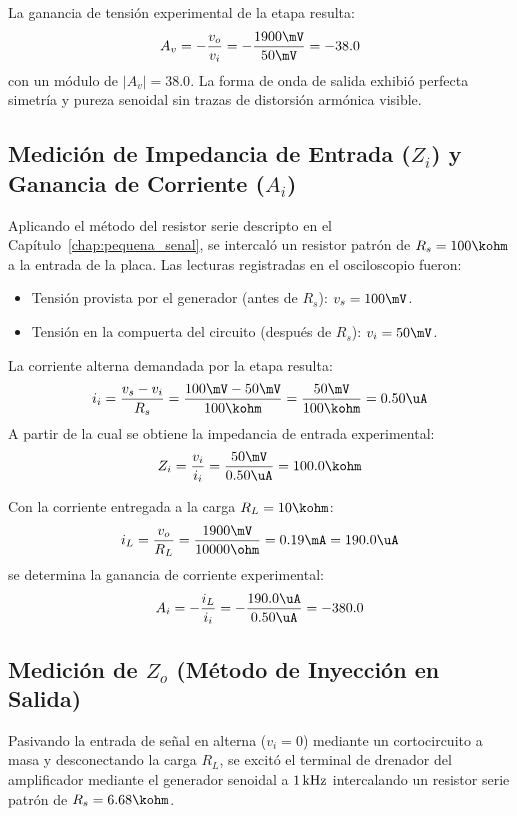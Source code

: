 La ganancia de tensión experimental de la etapa resulta:
\begin{equation}
  A_v = -\frac{v_o}{v_i} = -\frac{1900\mV}{50\mV} = -38.0
  \label{eq:Av_exp_tp5}
\end{equation}
con un módulo de $|A_v| = 38.0$. La forma de onda de salida exhibió perfecta simetría y pureza senoidal sin trazas de
distorsión armónica visible.

\subsection{Medición de Impedancia de Entrada (\texorpdfstring{$Z_i$}{Zi}) y Ganancia de Corriente (\texorpdfstring{$A_i$}{Ai})}
Aplicando el método del resistor serie descripto en el Capítulo~\ref{chap:pequena_senal}, se intercaló un resistor patrón
de $R_s = 100\kohm$ a la entrada de la placa. Las lecturas registradas en el osciloscopio fueron:
\begin{itemize}
  \item Tensión provista por el generador (antes de $R_s$): $v_s = 100\mV$.
  \item Tensión en la compuerta del circuito (después de $R_s$): $v_i = 50\mV$.
\end{itemize}

La corriente alterna demandada por la etapa resulta:
\begin{equation}
  i_i = \frac{v_s - v_i}{R_s} = \frac{100\mV - 50\mV}{100\kohm} = \frac{50\mV}{100\kohm} = 0.50\uA
  \label{eq:ii_exp_calc}
\end{equation}
A partir de la cual se obtiene la impedancia de entrada experimental:
\begin{equation}
  Z_i = \frac{v_i}{i_i} = \frac{50\mV}{0.50\uA} = 100.0\kohm
  \label{eq:Zi_exp_tp5}
\end{equation}

Con la corriente entregada a la carga $R_L = 10\kohm$:
\begin{equation}
  i_L = \frac{v_o}{R_L} = \frac{1900\mV}{10000\ohm} = 0.19\mA = 190.0\uA
\end{equation}
se determina la ganancia de corriente experimental:
\begin{equation}
  A_i = -\frac{i_L}{i_i} = -\frac{190.0\uA}{0.50\uA} = -380.0
  \label{eq:Ai_exp_tp5}
\end{equation}

\subsection{Medición de \texorpdfstring{$Z_o$}{Zo} (Método de Inyección en Salida)}
Pasivando la entrada de señal en alterna ($v_i = 0$) mediante un cortocircuito a masa y desconectando la carga $R_L$, se
excitó el terminal de drenador del amplificador mediante el generador senoidal a $1\,\mathrm{kHz}$ intercalando un resistor serie
patrón de $R_s = 6.68\kohm$.

